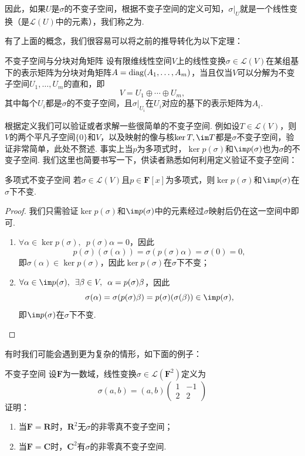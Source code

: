 因此，如果$U$是$\sigma$的不变子空间，根据不变子空间的定义可知，$\sigma\vert_U$就是一个线性变换（是$\mathcal{L}(U)$中的元素），我们称之为.

有了上面的概念，我们很容易可以将之前的推导转化为以下定理：
\begin{theorem}{}{不变子空间与分块对角矩阵}
    设有限维线性空间$V$上的线性变换$\sigma\in\mathcal{L}(V)$在某组基下的表示矩阵为分块对角矩阵$A=\operatorname{diag}(A_1,\ldots,A_m)$，当且仅当$V$可以分解为不变子空间$U_1,\ldots,U_m$的直和，即
    \[V=U_1\oplus\cdots\oplus U_m,\]
    其中每个$U_i$都是$\sigma$的不变子空间，且$\sigma\vert_{U_i}$在$U_i$对应的基下的表示矩阵为$A_i$.
\end{theorem}

根据定义我们可以验证或者求解一些很简单的不变子空间. 例如设$T\in \mathcal{L}(V)$，则$V$的两个平凡子空间$\{0\}$和$V$，以及映射的像与核$\ker T,\im T$都是$\sigma$不变子空间，验证非常简单，此处不赘述. 事实上当$p$为多项式时，$\ker p(\sigma)$和$\im p(\sigma)$也为$\sigma$的不变子空间. 我们这里也简要书写一下，供读者熟悉如何利用定义验证不变子空间：
\begin{example}{}{多项式不变子空间}
    若$\sigma\in\mathcal{L}(V)$且$p\in\mathbf{F}[x]$为多项式，则$\ker p(\sigma)$和$\im p(\sigma)$在$\sigma$下不变.
\end{example}

\begin{proof}
    我们只需验证$\ker p(\sigma)$和$\im p(\sigma)$中的元素经过$\sigma$映射后仍在这一空间中即可.
    \begin{enumerate}
        \item $\forall \alpha\in \ker p(\sigma),\enspace p(\sigma)\alpha=0$，因此
              \[p(\sigma)(\sigma(\alpha))=\sigma(p(\sigma)\alpha)=\sigma(0)=0,\]
              即$\sigma(\alpha)\in \ker p(\sigma)$，因此$\ker p(\sigma)$在$\sigma$下不变；

        \item $\forall \alpha\in \im p(\sigma),\enspace \exists \beta\in V,\enspace \alpha=p(\sigma)\beta$，因此
              \[\sigma(\alpha)=\sigma(p(\sigma)\beta)=p(\sigma)(\sigma(\beta))\in \im p(\sigma),\]
              即$\im p(\sigma)$在$\sigma$下不变.
    \end{enumerate}
\end{proof}

有时我们可能会遇到更为复杂的情形，如下面的例子：
\begin{example}{}{不变子空间}
    设$\mathbf{F}$为一数域，线性变换$\sigma\in\mathcal{L}(\mathbf{F}^2)$定义为
    \[\sigma(a,b)=(a,b)\begin{pmatrix}
            1 & -1 \\ 2 & 2
        \end{pmatrix}\]
    证明：
    \begin{enumerate}
        \item 当$\mathbf{F}=\mathbf{R}$时，$\mathbf{R}^2$无$\sigma$的非零真不变子空间；

        \item 当$\mathbf{F}=\mathbf{C}$时，$\mathbf{C}^2$有$\sigma$的非零真不变子空间.
    \end{enumerate}
\end{example}

